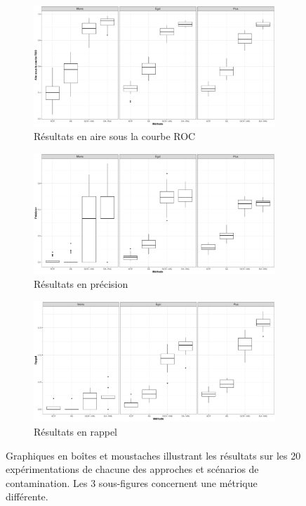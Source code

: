 \begin{figure}[H]
	\centering
	\begin{subfigure}{12cm}
		\includegraphics[width=12cm]{images/images_boxplots/auc_cars.pdf}
		\caption{Résultats en aire sous la courbe ROC}
	\end{subfigure}
	\begin{subfigure}{12cm}
		\includegraphics[width=12cm]{images/images_boxplots/precision_cars.pdf}
		\caption{Résultats en précision}
	\end{subfigure}
	\begin{subfigure}{12cm}
		\includegraphics[width=12cm]{images/images_boxplots/recall_cars.pdf}
		\caption{Résultats en rappel}
	\end{subfigure}
	\caption{Graphiques en boîtes et moustaches illustrant les résultats sur les 20 expérimentations de chacune des approches et scénarios de contamination. Les 3 sous-figures concernent une métrique différente.}
	\label{fig:auc_cars}
\end{figure}

